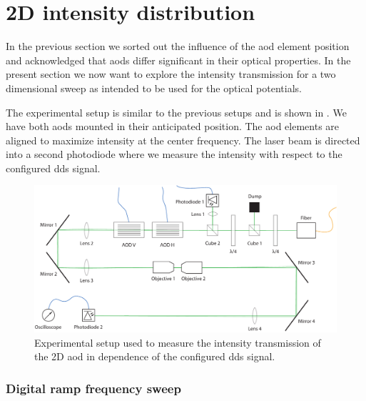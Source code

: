 \section{2D intensity distribution}

In the previous section we sorted out the influence of the \gls{aod} element
position and acknowledged that \gls{aod}s differ significant in their
optical properties. In the present section we now want to explore the
intensity transmission for a two dimensional sweep as intended to be used
for the optical potentials.

The experimental setup is similar to the previous setups and is shown in
. We have both \gls{aod}s mounted in
their anticipated position. The \gls{aod} elements are aligned to maximize
intensity at the center frequency. The laser beam is directed into a second
photodiode where we measure the intensity with respect to the configured
\gls{dds} signal.
\begin{figure}[htb]
  \centering
  \includegraphics[width=\textwidth]{../media/setup/intensity-distribution.pdf}
  \caption{Experimental setup used to measure the intensity transmission of
    the 2D \gls{aod} in dependence of the configured \gls{dds} signal.
  }\label{fig:intensity_distribution_setup}
\end{figure}

\subsubsection{Digital ramp frequency sweep}

